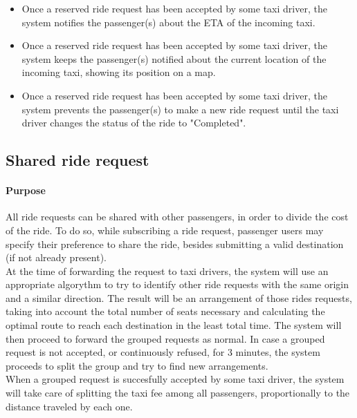 \begin{itemize}
			\item Once a reserved ride request has been accepted by some taxi driver, the system notifies the passenger(s) about the ETA of the incoming taxi.
			\item Once a reserved ride request has been accepted by some taxi driver, the system keeps the passenger(s) notified about the current location of the incoming taxi, showing its position on a map.
			\item Once a reserved ride request has been accepted by some taxi driver, the system prevents the passenger(s) to make a new ride request until the taxi driver changes the status of the ride to "Completed".
		\end{itemize}

\subsection{Shared ride request}
	\paragraph{Purpose}
		All ride requests can be shared with other passengers, in order to divide the cost of the ride. To do so, while subscribing a ride request, passenger users may specify their preference to share the ride, besides submitting a valid destination (if not already present).\\
		At the time of forwarding the request to taxi drivers, the system will use an appropriate algorythm to try to identify other ride requests with the same origin and a similar direction. The result will be an arrangement of those rides requests, taking into account the total number of seats necessary and calculating the optimal route to reach each destination in the least total time. The system will then proceed to forward the grouped requests as normal. In case a grouped request is not accepted, or continuously refused, for 3 minutes, the system proceeds to split the group and try to find new arrangements.\\
		When a grouped request is succesfully accepted by some taxi driver, the system will take care of splitting the taxi fee among all passengers, proportionally to the distance traveled by each one.
	

